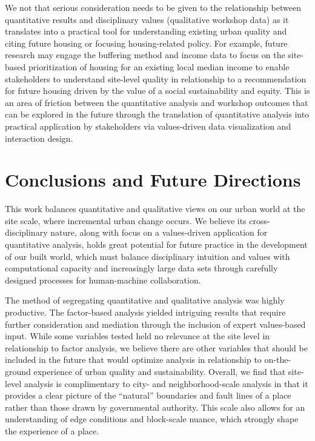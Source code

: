 \documentclass[
]{book}
\begin{document}
We not that serious consideration needs to be given to the relationship between quantitative results and disciplinary values (qualitative workshop data) as it translates into a practical tool for understanding existing urban quality and citing future housing or focusing housing-related policy. For example, future research may engage the buffering method and income data to focus on the site-based prioritization of housing for an existing local median income to enable stakeholders to understand site-level quality in relationship to a recommendation for future housing driven by the value of a social sustainability and equity. This is an area of friction between the quantitative analysis and workshop outcomes that can be explored in the future through the translation of quantitative analysis into practical application by stakeholders via values-driven data visualization and interaction design.

\hypertarget{conclusions-and-future-directions}{%
\chapter{Conclusions and Future Directions}\label{conclusions-and-future-directions}}

This work balances quantitative and qualitative views on our urban world at the site scale, where incremental urban change occurs. We believe its cross-disciplinary nature, along with focus on a values-driven application for quantitative analysis, holds great potential for future practice in the development of our built world, which must balance disciplinary intuition and values with computational capacity and increasingly large data sets through carefully designed processes for human-machine collaboration.

The method of segregating quantitative and qualitative analysis was highly productive. The factor-based analysis yielded intriguing results that require further consideration and mediation through the inclusion of expert values-based input. While some variables tested held no relevance at the site level in relationship to factor analysis, we believe there are other variables that should be included in the future that would optimize analysis in relationship to on-the-ground experience of urban quality and sustainability. Overall, we find that site-level analysis is complimentary to city- and neighborhood-scale analysis in that it provides a clear picture of the ``natural'' boundaries and fault lines of a place rather than those drawn by governmental authority. This scale also allows for an understanding of edge conditions and block-scale nuance, which strongly shape the experience of a place.
\end{document}
